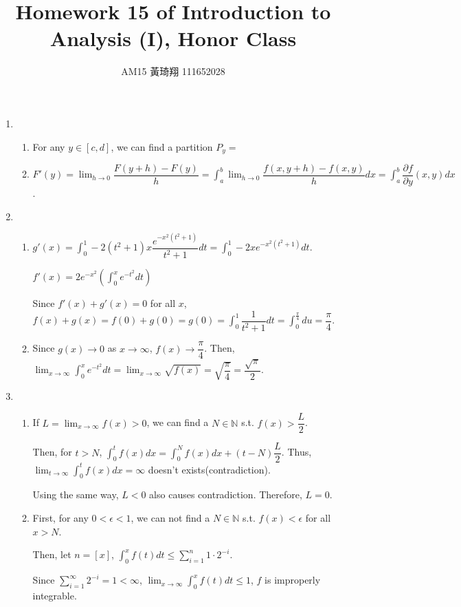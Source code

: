 \documentclass[12pt]{article}
\title{Homework 15 of Introduction to Analysis (I), Honor Class}
\author{AM15 黃琦翔 111652028}
\begin{document}
\maketitle
\begin{enumerate}
    \item \begin{enumerate}
        \item For any $y\in [c, d]$, we can find a partition $P_y = $

        \item $F'(y) = \displaystyle\lim_{h\to 0} \dfrac{F(y+h) - F(y)}{h} = \displaystyle\int_a^b \displaystyle\lim_{h\to 0} \dfrac{f(x, y+h) - f(x, y)}{h} dx = \displaystyle\int_a^b \dfrac{\partial f}{\partial y}(x, y) dx$.
    \end{enumerate}

    \item\begin{enumerate}
        \item $g'(x) = \displaystyle\int_0^1 -2(t^2+1)x\dfrac{e^{-x^2(t^2 + 1)}}{t^2+1}dt = \displaystyle\int_0^1 -2xe^{-x^2(t^2+1)} dt$.
        
        $f'(x) = 2e^{-x^2}(\displaystyle\int_0^x e^{-t^2} dt)$

        Since $f'(x) + g'(x) = 0$ for all $x$, $f(x) + g(x) = f(0) + g(0) = g(0) = \displaystyle\int_0^1 \dfrac{1}{t^2 + 1} dt =\displaystyle\int_0^\frac{\pi}{4} du = \dfrac{\pi}{4}$.

        \item Since $g(x) \to 0$ as $x \to \infty$, $f(x) \to \dfrac{\pi}{4}$.
        Then, $\displaystyle\lim_{x\to\infty} \displaystyle\int_0^x e^{-t^2} dt = \displaystyle\lim_{x\to\infty} \sqrt{f(x)} = \sqrt{\dfrac{\pi}{4}} = \dfrac{\sqrt{\pi}}{2}$.
    \end{enumerate}

    \item \begin{enumerate}
        \item If $L = \lim_{x \to \infty} f(x) > 0$, we can find a $N\in\mathbb{N}$ s.t. $f(x) > \dfrac{L}{2}$.
        
        Then, for $t > N$, $\displaystyle\int_0^t f(x) dx = \displaystyle\int_0^N f(x) dx + (t-N)\dfrac{L}{2}$.
        Thus, $\displaystyle\lim_{t\to\infty} \displaystyle\int_0^t f(x) dx = \infty$ doesn't exists(contradiction).

        Using the same way, $L < 0$ also causes contradiction.
        Therefore, $L = 0$.

        \item First, for any $0<\epsilon < 1$, we can not find a $N \in \mathbb{N}$ s.t. $f(x) < \epsilon$ for all $x > N$.
        
        Then, let $n = [x]$, $\displaystyle\int_0^x f(t) dt \leq \displaystyle\sum_{i=1}^{n} 1 \cdot 2^{-i}$.

        Since $\displaystyle\sum_{i=1}^{\infty} 2^{-i} = 1 < \infty$, $\displaystyle\lim_{x \to \infty}\displaystyle\int_0^x f(t) dt \leq 1$, $f$ is improperly integrable.
    \end{enumerate}
    
\end{enumerate}
\end{document}
